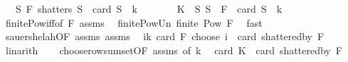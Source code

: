 \begin{isabellebody}
\ \ \ {\isachardoublequoteopen}{\isasymexists}S{\isachardot}{\kern0pt}\ {\isacharparenleft}{\kern0pt}F\ shatters\ S\ {\isasymand}\ card\ S\ {\isacharequal}{\kern0pt}\ k\ {\isacharplus}{\kern0pt}\ {}{\isacharparenright}{\kern0pt}{\isachardoublequoteclose}\isanewline
%
\isadelimproof
%
\endisadelimproof
%
\isatagproof
{}\isamarkupfalse%
\ {\isacharminus}{\kern0pt}\isanewline
\ \ \isamarkupfalse%
\ {\isacharquery}{\kern0pt}K\ {\isacharequal}{\kern0pt}\ {\isachardoublequoteopen}{\isacharbraceleft}{\kern0pt}S{\isachardot}{\kern0pt}\ S\ {\isasymsubseteq}\ {\isasymUnion}F\ {\isasymand}\ card\ S\ {\isasymle}\ k{\isacharbraceright}{\kern0pt}{\isachardoublequoteclose}\isanewline
\ \ \isamarkupfalse%
\ finite{\isacharunderscore}{\kern0pt}Pow{\isacharunderscore}{\kern0pt}iff{\isacharbrackleft}{\kern0pt}of\ F{\isacharbrackright}{\kern0pt}\ assms{\isacharparenleft}{\kern0pt}{}{\isacharparenright}{\kern0pt}\ \isamarkupfalse%
\ finite{\isacharunderscore}{\kern0pt}Pow{\isacharunderscore}{\kern0pt}Un{\isacharcolon}{\kern0pt}\ {\isachardoublequoteopen}finite\ {\isacharparenleft}{\kern0pt}Pow\ {\isacharparenleft}{\kern0pt}{\isasymUnion}F{\isacharparenright}{\kern0pt}{\isacharparenright}{\kern0pt}{\isachardoublequoteclose}\ \isamarkupfalse%
\ fast\isanewline
\isanewline
\ \ \isamarkupfalse%
\ sauer{\isacharunderscore}{\kern0pt}shelah{\isacharunderscore}{\kern0pt}{}{\isacharbrackleft}{\kern0pt}OF\ assms{\isacharparenleft}{\kern0pt}{}{\isacharparenright}{\kern0pt}{\isacharbrackright}{\kern0pt}\ assms{\isacharparenleft}{\kern0pt}{}{\isacharparenright}{\kern0pt}\ \isamarkupfalse%
\ {\isachardoublequoteopen}{\isacharparenleft}{\kern0pt}{\isasymSum}i{\isasymle}k{\isachardot}{\kern0pt}\ card\ {\isacharparenleft}{\kern0pt}{\isasymUnion}F{\isacharparenright}{\kern0pt}\ choose\ i{\isacharparenright}{\kern0pt}\ {\isacharless}{\kern0pt}\ card\ {\isacharparenleft}{\kern0pt}shattered{\isacharunderscore}{\kern0pt}by\ F{\isacharparenright}{\kern0pt}{\isachardoublequoteclose}\ \isamarkupfalse%
\ linarith\isanewline
\ \ \isamarkupfalse%
\ choose{\isacharunderscore}{\kern0pt}row{\isacharunderscore}{\kern0pt}sum{\isacharunderscore}{\kern0pt}set{\isacharbrackleft}{\kern0pt}OF\ assms{\isacharparenleft}{\kern0pt}{}{\isacharparenright}{\kern0pt}{\isacharcomma}{\kern0pt}\ of\ k{\isacharbrackright}{\kern0pt}\ \isamarkupfalse%
\ {\isachardoublequoteopen}card\ {\isacharquery}{\kern0pt}K\ {\isacharless}{\kern0pt}\ card\ {\isacharparenleft}{\kern0pt}shattered{\isacharunderscore}{\kern0pt}by\ F{\isacharparenright}{\kern0pt}{\isachardoublequoteclose}\ \isamarkupfalse%

\end{isabellebody}
